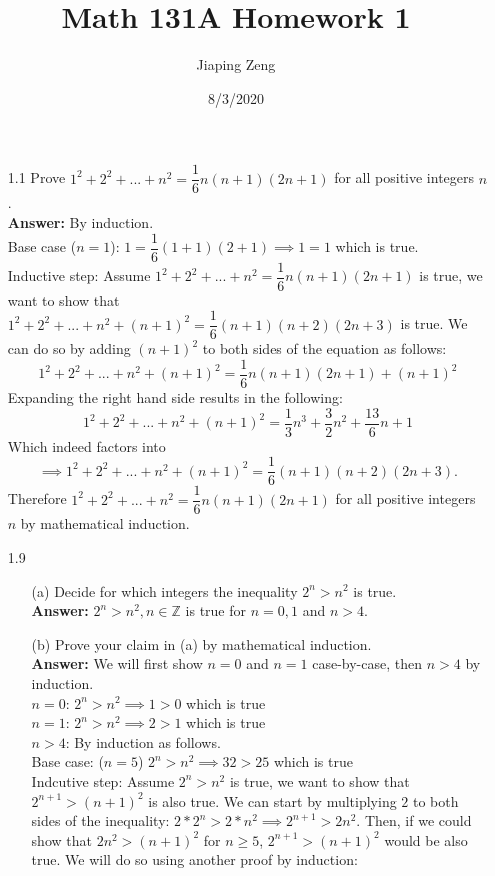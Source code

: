 \documentclass{article}
\title{Math 131A Homework 1}
\date{8/3/2020}
\author{Jiaping Zeng}
\begin{document}
\maketitle

\begin{itemize}
      \item [1.1] Prove $1^2+2^2+...+n^2=\dfrac{1}{6}n(n+1)(2n+1)$ for all positive integers $n$.\\\textbf{Answer: } By induction. \\
            Base case ($n=1$): $1=\dfrac{1}{6}(1+1)(2+1)\implies1=1$ which is true. \\
            Inductive step: Assume $1^2+2^2+...+n^2=\dfrac{1}{6}n(n+1)(2n+1)$ is true, we want to show that $1^2+2^2+...+n^2+(n+1)^2=\dfrac{1}{6}(n+1)(n+2)(2n+3)$ is true. We can do so by adding $(n+1)^2$ to both sides of the equation as follows:
            \[1^2+2^2+...+n^2+(n+1)^2=\dfrac{1}{6}n(n+1)(2n+1)+(n+1)^2\]
            Expanding the right hand side results in the following:
            \[1^2+2^2+...+n^2+(n+1)^2=\dfrac{1}{3}n^3+\dfrac{3}{2}n^2+\dfrac{13}{6}n+1\]
            Which indeed factors into
            \[\implies1^2+2^2+...+n^2+(n+1)^2=\dfrac{1}{6}(n+1)(n+2)(2n+3).\]
            Therefore $1^2+2^2+...+n^2=\dfrac{1}{6}n(n+1)(2n+1)$ for all positive integers $n$ by mathematical induction.
      \item [1.9]
            \begin{itemize}
                  \item [(a)] Decide for which integers the inequality $2^n>n^2$ is true.\\
                        \textbf{Answer: } $2^n>n^2, n\in\mathbb{Z}$ is true for $n=0,1$ and $n>4$.
                  \item [(b)] Prove your claim in (a) by mathematical induction.\\
                        \textbf{Answer: } We will first show $n=0$ and $n=1$ case-by-case, then $n>4$ by induction.\\
                        $n=0$: $2^n>n^2\implies 1>0$ which is true\\
                        $n=1$: $2^n>n^2\implies 2>1$ which is true\\
                        $n>4$: By induction as follows.\\
                        Base case: ($n=5$) $2^n>n^2\implies 32>25$ which is true\\
                        Indcutive step: Assume $2^n>n^2$ is true, we want to show that $2^{n+1}>(n+1)^2$ is also true. We can start by multiplying $2$ to both sides of the inequality: $2*2^n>2*n^2\implies 2^{n+1}>2n^2$. Then, if we could show that $2n^2>(n+1)^2$ for $n\geq 5$, $2^{n+1}>(n+1)^2$ would be also true. We will do so using another proof by induction: \begin{itemize}

\end{itemize}
\end{itemize}
\end{itemize}
\end{document}
